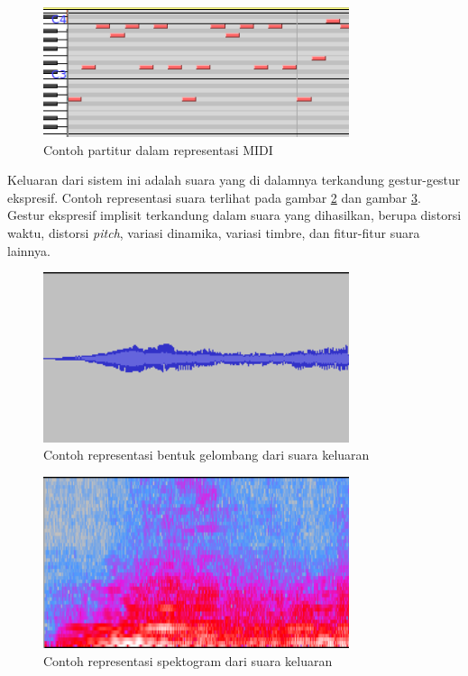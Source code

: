 \begin{figure}[h]
    \centering
    \includegraphics[width=0.8\textwidth]{resources/sheet-example-midi.png}
    \caption{Contoh partitur dalam representasi MIDI} \label{midimusicsheet}
\end{figure}

Keluaran dari sistem ini adalah suara yang di dalamnya terkandung gestur-gestur ekspresif. Contoh representasi suara terlihat pada gambar \ref{waveformexample} dan gambar \ref{spectogramexample}. Gestur ekspresif implisit terkandung dalam suara yang dihasilkan, berupa distorsi waktu, distorsi \textit{pitch}, variasi dinamika, variasi timbre, dan fitur-fitur suara lainnya.

\begin{figure}[h]
    \centering
    \includegraphics[width=0.8\textwidth]{resources/waveform-example.png}
    \caption{Contoh representasi bentuk gelombang dari suara keluaran} \label{waveformexample}
\end{figure}

\begin{figure}[h]
    \centering
    \includegraphics[width=0.8\textwidth]{resources/spectogram-example.png}
    \caption{Contoh representasi spektogram dari suara keluaran} \label{spectogramexample}
\end{figure}

